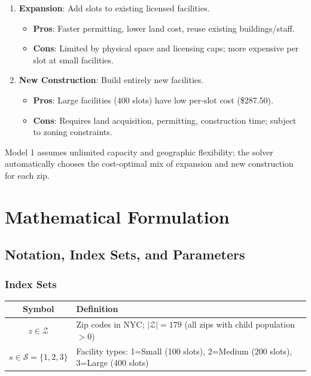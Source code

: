 \documentclass[12pt]{article}
\begin{document}
\begin{enumerate}
    \item \textbf{Expansion}: Add slots to existing licensed facilities.
    \begin{itemize}
        \item \textbf{Pros}: Faster permitting, lower land cost, reuse existing buildings/staff.
        \item \textbf{Cons}: Limited by physical space and licensing caps; more expensive per slot at small facilities.
    \end{itemize}
    
    \item \textbf{New Construction}: Build entirely new facilities.
    \begin{itemize}
        \item \textbf{Pros}: Large facilities (400 slots) have low per-slot cost (\$287.50).
        \item \textbf{Cons}: Requires land acquisition, permitting, construction time; subject to zoning constraints.
    \end{itemize}
\end{enumerate}

\noindent
Model 1 assumes unlimited capacity and geographic flexibility; the solver automatically chooses the 
cost-optimal mix of expansion and new construction for each zip.

\section{Mathematical Formulation}

\subsection{Notation, Index Sets, and Parameters}

\subsubsection{Index Sets}

\begin{table}[h]
\centering
\begin{tabular}{|c|p{10cm}|}
\hline
\textbf{Symbol} & \textbf{Definition} \\
\hline
$z \in \mathcal{Z}$ & Zip codes in NYC; $|\mathcal{Z}| = 179$ (all zips with child population $> 0$) \\
\hline
$s \in \mathcal{S} = \{1, 2, 3\}$ & Facility types: 1=Small (100 slots), 2=Medium (200 slots), 3=Large (400 slots) \\
\hline
\end{tabular}
\end{table}
\end{document}
